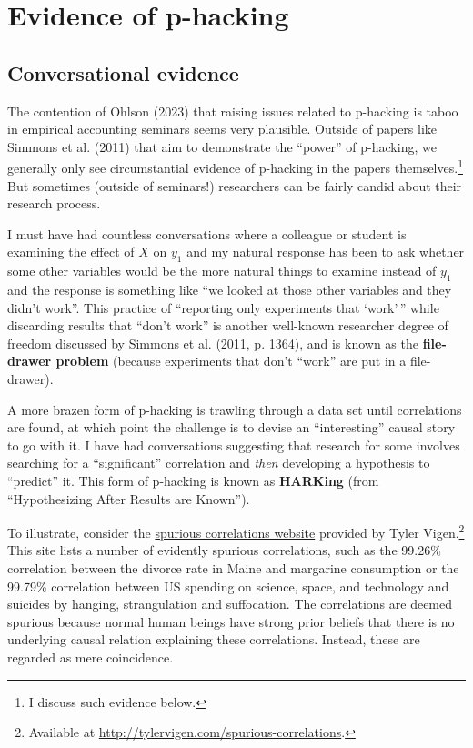 \documentclass[
  letterpaper,
  DIV=11,
  numbers=noendperiod]{scrartcl}
\begin{document}
\hypertarget{evidence-of-p-hacking}{%
\section{Evidence of p-hacking}\label{evidence-of-p-hacking}}

\hypertarget{conversational-evidence}{%
\subsection{Conversational evidence}\label{conversational-evidence}}

The contention of Ohlson (2023) that raising issues related to p-hacking
is taboo in empirical accounting seminars seems very plausible. Outside
of papers like Simmons et al. (2011) that aim to demonstrate the
``power'' of p-hacking, we generally only see circumstantial evidence of
p-hacking in the papers themselves.\footnote{I discuss such evidence
  below.} But sometimes (outside of seminars!) researchers can be fairly
candid about their research process.

I must have had countless conversations where a colleague or student is
examining the effect of \(X\) on \(y_1\) and my natural response has
been to ask whether some other variables would be the more natural
things to examine instead of \(y_1\) and the response is something like
``we looked at those other variables and they didn't work''. This
practice of ``reporting only experiments that `work'\,'' while
discarding results that ``don't work'' is another well-known researcher
degree of freedom discussed by Simmons et al. (2011, p. 1364), and is
known as the \textbf{file-drawer problem} (because experiments that
don't ``work'' are put in a file-drawer).

A more brazen form of p-hacking is trawling through a data set until
correlations are found, at which point the challenge is to devise an
``interesting'' causal story to go with it. I have had conversations
suggesting that research for some involves searching for a
``significant'' correlation and \emph{then} developing a hypothesis to
``predict'' it. This form of p-hacking is known as \textbf{HARKing}
(from ``Hypothesizing After Results are Known'').

To illustrate, consider the
\href{http://tylervigen.com/spurious-correlations}{spurious correlations
website} provided by Tyler Vigen.\footnote{Available at
  \url{http://tylervigen.com/spurious-correlations}.} This site lists a
number of evidently spurious correlations, such as the 99.26\%
correlation between the divorce rate in Maine and margarine consumption
or the 99.79\% correlation between US spending on science, space, and
technology and suicides by hanging, strangulation and suffocation. The
correlations are deemed spurious because normal human beings have strong
prior beliefs that there is no underlying causal relation explaining
these correlations. Instead, these are regarded as mere coincidence.
\end{document}
